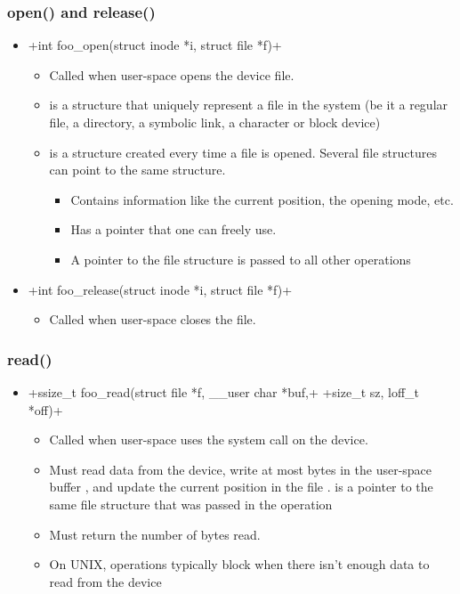 \begin{frame}[fragile]
  \frametitle{open() and release()}
  \begin{itemize}
  \item {}+int foo_open(struct inode *i, struct file *f)+
    \begin{itemize}
    \item Called when user-space opens the device file.
    \item {} is a structure that uniquely represent a file
      in the system (be it a regular file, a directory, a symbolic
      link, a character or block device)
    \item {} is a structure created every time a file is
      opened. Several file structures can point to the same
       structure.
      \begin{itemize}
      \item Contains information like the current position, the
        opening mode, etc.
      \item Has a  pointer that one can
        freely use.
      \item A pointer to the file structure is passed to all other
        operations
      \end{itemize}
    \end{itemize}
  \item {}+int foo_release(struct inode *i, struct file *f)+
    \begin{itemize}
    \item Called when user-space closes the file.
    \end{itemize}
  \end{itemize}
\end{frame}

\begin{frame}
  \frametitle{read()}
  \begin{itemize}
  \item {}+ssize_t foo_read(struct file *f, __user char *buf,+
    +size_t sz, loff_t *off)+
    \begin{itemize}
    \item Called when user-space uses the  system call on
      the device.
    \item Must read data from the device, write at most 
      bytes in the user-space buffer , and update the
      current position in the file .  is a pointer
      to the same file structure that was passed in the 
      operation
    \item Must return the number of bytes read.
    \item On UNIX,  operations typically block when there
      isn't enough data to read from the device
    \end{itemize}
  \end{itemize}
\end{frame}

